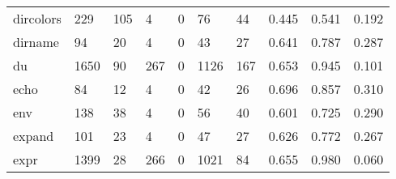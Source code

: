 \begin{longtable}{lp{2.0cm}p{2.0cm}p{2.0cm}p{2.0cm}p{2.0cm}p{2.0cm}p{2.0cm}p{2.0cm}p{2.0cm}}
dircolors &                    229 &                                105 &                                 4 &                                0 &                                76 &                              44 &                                0.445 &                                  0.541 &                                0.192 \\
dirname   &                     94 &                                 20 &                                 4 &                                0 &                                43 &                              27 &                                0.641 &                                  0.787 &                                0.287 \\
du        &                   1650 &                                 90 &                               267 &                                0 &                              1126 &                             167 &                                0.653 &                                  0.945 &                                0.101 \\
echo      &                     84 &                                 12 &                                 4 &                                0 &                                42 &                              26 &                                0.696 &                                  0.857 &                                0.310 \\
env       &                    138 &                                 38 &                                 4 &                                0 &                                56 &                              40 &                                0.601 &                                  0.725 &                                0.290 \\
expand    &                    101 &                                 23 &                                 4 &                                0 &                                47 &                              27 &                                0.626 &                                  0.772 &                                0.267 \\
expr      &                   1399 &                                 28 &                               266 &                                0 &                              1021 &                              84 &                                0.655 &                                  0.980 &                                0.060 \\

\end{longtable}
